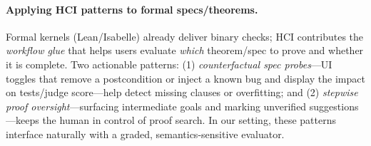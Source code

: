 \documentclass[numbers]{article}
\begin{document}
\paragraph{Applying HCI patterns to formal specs/theorems.}
Formal kernels (Lean/Isabelle) already deliver binary checks; HCI contributes the \emph{workflow glue} that helps users evaluate \emph{which} theorem/spec to prove and whether it is complete. Two actionable patterns: (1) \emph{counterfactual spec probes}---UI toggles that remove a postcondition or inject a known bug and display the impact on tests/judge score---help detect missing clauses or overfitting; and (2) \emph{stepwise proof oversight}---surfacing intermediate goals and marking unverified suggestions---keeps the human in control of proof search. In our setting, these patterns interface naturally with a graded, semantics-sensitive evaluator.%


\end{document}
